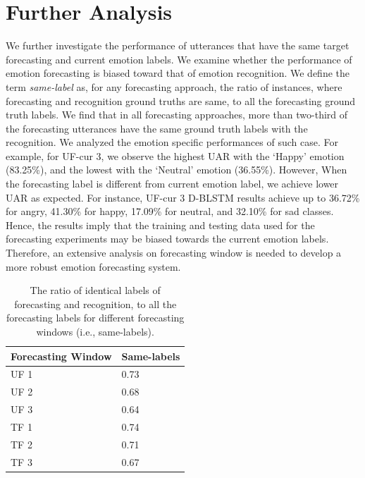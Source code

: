 \section{Further Analysis}
We further investigate the performance of utterances that have the same target forecasting and current emotion labels. We examine whether the performance of emotion forecasting is biased toward that of emotion recognition. We define the term \textit{same-label} as, for any forecasting approach, the ratio of instances, where forecasting and recognition ground truths are same, to all the forecasting ground truth labels. We find that in all forecasting approaches, more than two-third of the forecasting utterances have the same ground truth labels with the recognition. We analyzed the emotion specific performances of such case. For example, for UF-cur 3, we observe the highest UAR with the `Happy' emotion (83.25\%), and the lowest with the `Neutral' emotion (36.55\%). However, When the forecasting label is different from current emotion label, we achieve lower UAR as expected. For instance, UF-cur 3 D-BLSTM results achieve up to 36.72\% for angry, 41.30\% for happy, 17.09\% for neutral, and 32.10\% for sad classes. Hence, the results imply that the training and testing data used for the forecasting experiments may be biased towards the current emotion labels. Therefore, an extensive analysis on forecasting window is needed to develop a more robust emotion forecasting system. 

\begin{table}[h]
\centering
\caption{The ratio of identical labels of forecasting and recognition, to all the forecasting labels for different forecasting windows (i.e., same-labels). 
}
\begin{tabular}{ l l}
\hline
\textbf{Forecasting Window} & \textbf{Same-labels} \\
\hline
\hline
UF 1 & 0.73 \\
UF 2 & 0.68\\
UF 3 & 0.64\\
\hline
TF 1 & 0.74\\
TF 2 & 0.71\\
TF 3 & 0.67\\
\hline
\end{tabular}
\label{table:similarity}
\end{table}

